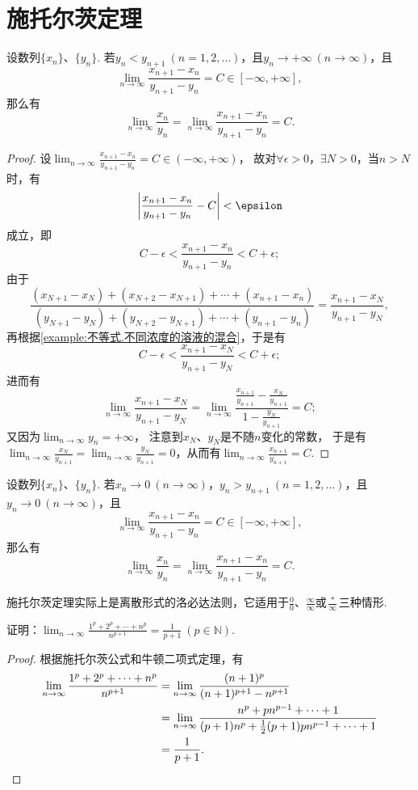 \section{施托尔茨定理}

\begin{theorem}[施托尔茨定理I]\label{theorem:极限.施托尔茨定理1}
设数列\(\{x_n\}\)、\(\{y_n\}\).
若\(y_n < y_{n+1}\ (n=1,2,\dotsc)\)，且\(y_n \to +\infty\ (n\to\infty)\)，且\[
\lim_{n\to\infty} \frac{x_{n+1}-x_n}{y_{n+1}-y_n} = C\in[-\infty,+\infty],
\]那么有\[
\lim_{n\to\infty} \frac{x_n}{y_n}
= \lim_{n\to\infty} \frac{x_{n+1}-x_n}{y_{n+1}-y_n}
= C.
\]
\begin{proof}%
设\(\lim_{n\to\infty} \frac{x_{n+1}-x_n}{y_{n+1}-y_n} = C\in(-\infty,+\infty)\)，
故对\(\forall\epsilon>0\)，\(\exists N>0\)，当\(n > N\)时，有\[
\abs{\frac{x_{n+1}-x_n}{y_{n+1}-y_n} - C} < \epsilon
\]成立，即\[
C - \epsilon < \frac{x_{n+1}-x_n}{y_{n+1}-y_n} < C + \epsilon;
\]
由于\[
\frac{
(x_{N+1}-x_N)
+ (x_{N+2}-x_{N+1})
+ \dotsb
+ (x_{n+1}-x_n)
}{
(y_{N+1}-y_N)
+ (y_{N+2}-y_{N+1})
+ \dotsb
+ (y_{n+1}-y_n)
}
= \frac{x_{n+1}-x_N}{y_{n+1}-y_N},
\]再根据\cref{example:不等式.不同浓度的溶液的混合}，于是有\[
C - \epsilon <
\frac{x_{n+1}-x_N}{y_{n+1}-y_N}
< C + \epsilon;
\]进而有\[
\lim_{n\to\infty} \frac{x_{n+1}-x_N}{y_{n+1}-y_N}
= \lim_{n\to\infty} \frac{\frac{x_{n+1}}{y_{n+1}}-\frac{x_N}{y_{n+1}}}{1-\frac{y_N}{y_{n+1}}}
= C;
\]又因为\(\lim_{n\to\infty} y_n = +\infty\)，
注意到\(x_N\)、\(y_N\)是不随\(n\)变化的常数，
于是有\(\lim_{n\to\infty} \frac{x_N}{y_{n+1}}
= \lim_{n\to\infty} \frac{y_N}{y_{n+1}}
= 0\)，从而有\(\lim_{n\to\infty} \frac{x_{n+1}}{y_{n+1}} = C\).
\end{proof}
\end{theorem}

\begin{theorem}[施托尔茨定理II]\label{theorem:极限.施托尔茨定理2}
设数列\(\{x_n\}\)、\(\{y_n\}\).
若\(x_n\to0\ (n\to\infty)\)，\(y_n > y_{n+1}\ (n=1,2,\dotsc)\)，且\(y_n\to0\ (n\to\infty)\)，且\[
\lim_{n\to\infty} \frac{x_{n+1}-x_n}{y_{n+1}-y_n} = C\in[-\infty,+\infty],
\]那么有\[
\lim_{n\to\infty} \frac{x_n}{y_n}
= \lim_{n\to\infty} \frac{x_{n+1}-x_n}{y_{n+1}-y_n}
= C.
\]
\end{theorem}

施托尔茨定理实际上是离散形式的洛必达法则，它适用于\(\frac{0}{0}\)、\(\frac{\infty}{\infty}\)或\(\frac{*}{\infty}\)三种情形.

\begin{example}\label{example:极限.解极限常用公式方法.例1}
证明：\(\lim_{n\to\infty} \frac{1^p+2^p+\dotsb+n^p}{n^{p+1}}
= \frac{1}{p+1}\ (p\in\mathbb{N})\).
\begin{proof}
根据施托尔茨公式和牛顿二项式定理，有\begin{align*}
	\lim_{n\to\infty} \frac{1^p+2^p+\dotsb+n^p}{n^{p+1}}
	&= \lim_{n\to\infty} \frac{(n+1)^p}{(n+1)^{p+1} - n^{p+1}} \\
	&= \lim_{n\to\infty} \frac{n^p + p n^{p-1} + \dotsb + 1}
		{(p+1) n^p + \frac{1}{2} (p+1) p n^{p-1} + \dotsb + 1} \\
	&= \frac{1}{p+1}.
	\qedhere
\end{align*}
\end{proof}
\end{example}


